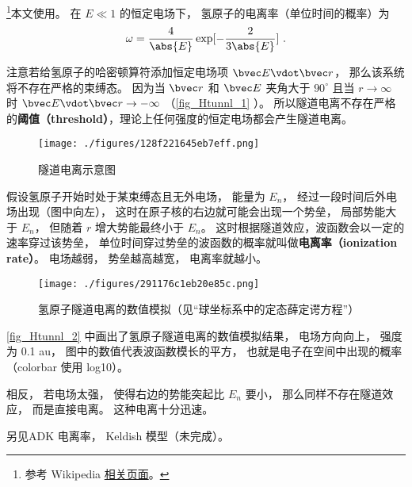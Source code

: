 

\footnote{参考 Wikipedia \href{https://en.wikipedia.org/wiki/Tunnel_ionization}{相关页面}。}本文使用。 在 $E \ll 1$ 的恒定电场下， 氢原子的电离率（单位时间的概率）为
\begin{equation}
\omega = \frac{4}{\abs{E}} \exp[-\frac{2}{3\abs{E}}]~.
\end{equation}

注意若给氢原子的哈密顿算符添加恒定电场项 $\bvec E \vdot \bvec r$， 那么该系统将不存在严格的束缚态。 因为当 $\bvec r$ 和 $\bvec E$ 夹角大于 $90^\circ$ 且当 $r\to\infty$ 时 $\bvec E \vdot \bvec r \to -\infty$ （\autoref{fig_Htunnl_1} ）。 所以隧道电离不存在严格的\textbf{阈值（threshold）}，理论上任何强度的恒定电场都会产生隧道电离。

\begin{figure}[ht]
\centering
\texttt{[image: ./figures/128f221645eb7eff.png]}
\caption{隧道电离示意图} \label{fig_Htunnl_1}
\end{figure}

假设氢原子开始时处于某束缚态且无外电场， 能量为 $E_n$， 经过一段时间后外电场出现（图中向左）， 这时在原子核的右边就可能会出现一个势垒， 局部势能大于 $E_n$， 但随着 $r$ 增大势能最终小于 $E_n$。 这时根据隧道效应，波函数会以一定的速率穿过该势垒， 单位时间穿过势垒的波函数的概率就叫做\textbf{电离率（ionization rate）}。 电场越弱， 势垒越高越宽， 电离率就越小。

\begin{figure}[ht]
\centering
\texttt{[image: ./figures/291176c1eb20e85c.png]}
\caption{氢原子隧道电离的数值模拟（见“球坐标系中的定态薛定谔方程”）} \label{fig_Htunnl_2}
\end{figure}
\autoref{fig_Htunnl_2} 中画出了氢原子隧道电离的数值模拟结果， 电场方向向上， 强度为 0.1 au， 图中的数值代表波函数模长的平方， 也就是电子在空间中出现的概率（colorbar 使用 log10）。

相反， 若电场太强， 使得右边的势能突起比 $E_n$ 要小， 那么同样不存在隧道效应， 而是直接电离。 这种电离十分迅速。

另见ADK 电离率， Keldish 模型（未完成）。
